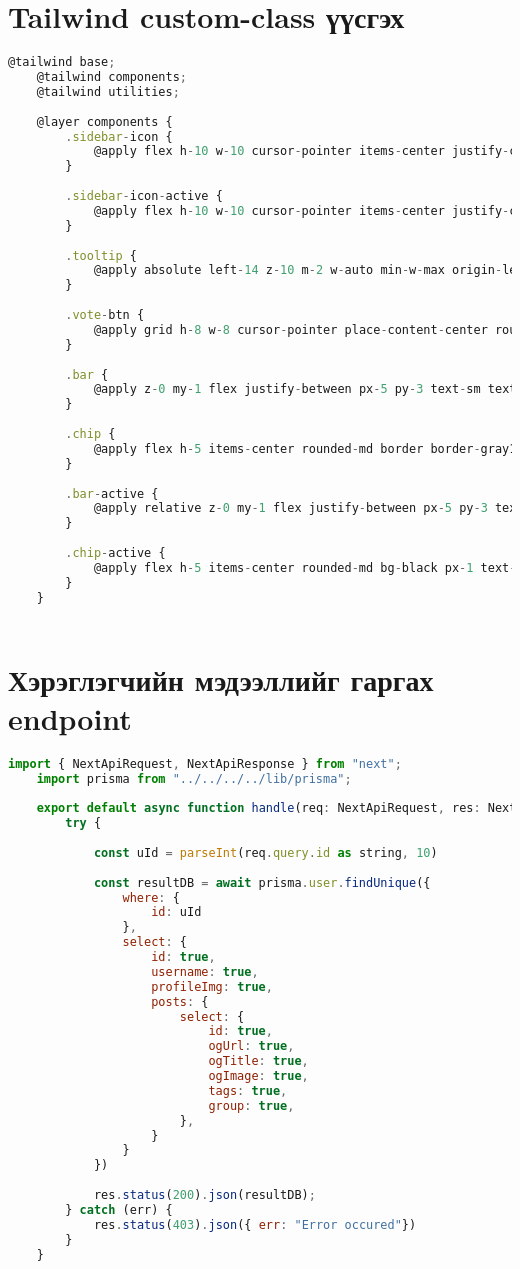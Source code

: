 \chapter{Tailwind custom-class үүсгэх}
\label{appendix:custom-class}

\begin{lstlisting}[language=Javascript, frame=single]
	@tailwind base;
	@tailwind components;
	@tailwind utilities;
	
	@layer components {
		.sidebar-icon {
			@apply flex h-10 w-10 cursor-pointer items-center justify-center rounded-lg transition-all duration-75 hover:border-2 hover:border-primary;
		}
	
		.sidebar-icon-active {
			@apply flex h-10 w-10 cursor-pointer items-center justify-center rounded-lg border-2 border-primary bg-white hover:bg-gray100;
		}
	
		.tooltip {
			@apply absolute left-14 z-10 m-2 w-auto min-w-max origin-left scale-0 rounded-md bg-gray-900 p-2 text-xs font-bold text-white shadow-md transition-all duration-100;
		}
	
		.vote-btn {
			@apply grid h-8 w-8 cursor-pointer place-content-center rounded-lg border border-gray200 bg-white hover:border-gray100;
		}
	
		.bar {
			@apply z-0 my-1 flex justify-between px-5 py-3 text-sm text-description transition-all duration-100 hover:text-black;
		}
	
		.chip {
			@apply flex h-5 items-center rounded-md border border-gray100 bg-gray300 px-1 text-xs;
		}
	
		.bar-active {
			@apply relative z-0 my-1 flex justify-between px-5 py-3 text-sm transition-all duration-100 hover:text-black;
		}
	
		.chip-active {
			@apply flex h-5 items-center rounded-md bg-black px-1 text-xs text-white;
		}
	}
	
\end{lstlisting}

\chapter{Хэрэглэгчийн мэдээллийг гаргах endpoint}
\label{appendix:user-post-endpoint}

\begin{lstlisting}[language=Javascript, frame=single]
	import { NextApiRequest, NextApiResponse } from "next";
	import prisma from "../../../../lib/prisma";
	
	export default async function handle(req: NextApiRequest, res: NextApiResponse) {
		try {
			
			const uId = parseInt(req.query.id as string, 10)
			
			const resultDB = await prisma.user.findUnique({
				where: {
					id: uId
				},
				select: {
					id: true,
					username: true,
					profileImg: true,
					posts: {
						select: {
							id: true,
							ogUrl: true,
							ogTitle: true,
							ogImage: true,
							tags: true,
							group: true,
						},
					}
				}
			})
	
			res.status(200).json(resultDB);
		} catch (err) {
			res.status(403).json({ err: "Error occured"})
		}
	}
\end{lstlisting}

